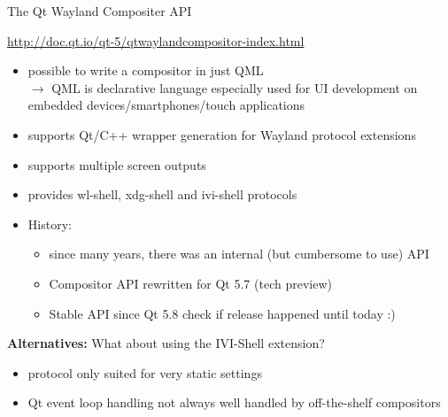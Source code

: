 \documentclass[ucs,9pt]{beamer}
\begin{document}
\begin{frame}
    {The Qt Wayland Compositer API}

    \url{http://doc.qt.io/qt-5/qtwaylandcompositor-index.html}

    \begin{itemize}
        \item possible to write a compositor in just QML\\
            $\rightarrow$ QML is declarative language especially used for UI development on embedded devices/smartphones/touch applications
        \item supports Qt/C++ wrapper generation for Wayland protocol extensions
        \item supports multiple screen outputs
        \item provides wl-shell, xdg-shell and ivi-shell protocols
        \item History:
            \begin{itemize}
                \item since many years, there was an internal (but cumbersome to use) API
                \item Compositor API rewritten for Qt 5.7 (tech preview)
                \item Stable API since Qt 5.8 \alert{check if release happened until today :)}
            \end{itemize}
    \end{itemize}
    \medskip

    \textbf{Alternatives:} What about using the IVI-Shell extension?
    \begin{itemize}
        \item protocol only suited for very static settings
        \item Qt event loop handling not always well handled by off-the-shelf compositors
    \end{itemize}
\end{frame}
\end{document}
